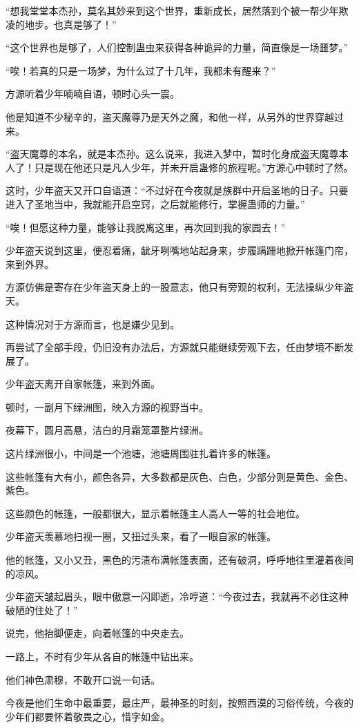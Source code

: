 \begin{this_body}
“想我堂堂本杰孙，莫名其妙来到这个世界，重新成长，居然落到个被一帮少年欺凌的地步。也真是够了！”

“这个世界也是够了，人们控制蛊虫来获得各种诡异的力量，简直像是一场噩梦。”

“唉！若真的只是一场梦，为什么过了十几年，我都未有醒来？”

方源听着少年喃喃自语，顿时心头一震。

他是知道不少秘辛的，盗天魔尊乃是天外之魔，和他一样，从另外的世界穿越过来。

“盗天魔尊的本名，就是本杰孙。这么说来，我进入梦中，暂时化身成盗天魔尊本人了！只是现在他还只是凡人少年，并未开启蛊修的旅程呢。”方源心中顿时了然。

这时，少年盗天又开口自语道：“不过好在今夜就是族群中开启圣地的日子。只要进入了圣地当中，我就能开启空窍，之后就能修行，掌握蛊师的力量。”

“唉！但愿这种力量，能够让我脱离这里，再次回到我的家园去！”

少年盗天说到这里，便忍着痛，龇牙咧嘴地站起身来，步履蹒跚地掀开帐篷门帘，来到外界。

方源仿佛是寄存在少年盗天身上的一股意志，他只有旁观的权利，无法操纵少年盗天。

这种情况对于方源而言，也是嫌少见到。

再尝试了全部手段，仍旧没有办法后，方源就只能继续旁观下去，任由梦境不断发展了。

少年盗天离开自家帐篷，来到外面。

顿时，一副月下绿洲图，映入方源的视野当中。

夜幕下，圆月高悬，洁白的月霜笼罩整片绿洲。

这片绿洲很小，中间是一个池塘，池塘周围驻扎着许多的帐篷。

这些帐篷有大有小，颜色各异，大多数都是灰色、白色，少部分则是黄色、金色、紫色。

这些颜色的帐篷，一般都很大，显示着帐篷主人高人一等的社会地位。

少年盗天羡慕地扫视一圈，又扭过头来，看了一眼自家的帐篷。

他的帐篷，又小又丑，黑色的污渍布满帐篷表面，还有破洞，呼呼地往里灌着夜间的凉风。

少年盗天皱起眉头，眼中傲意一闪即逝，冷哼道：“今夜过去，我就再不必住这种破陋的住处了！”

说完，他抬脚便走，向着帐篷的中央走去。

一路上，不时有少年从各自的帐篷中钻出来。

他们神色肃穆，不敢开口说一句话。

今夜是他们生命中最重要，最庄严，最神圣的时刻，按照西漠的习俗传统，今夜的少年们都要怀着敬畏之心，惜字如金。


\end{this_body}
